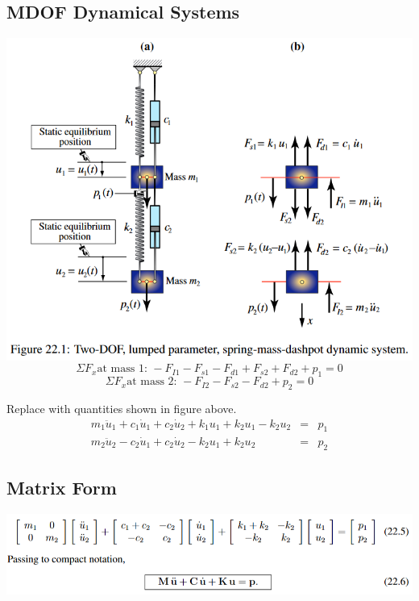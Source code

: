 \documentclass{article}
\begin{document}
\begin{multicols*}{2}
    \section*{MDOF Dynamical Systems}
    \includegraphics[width=\linewidth]{Figures/MDOF.png}
    $$\Sigma F_x \text{at mass 1: } -F_{I1}-F_{s1}-F_{d1}+F_{s2}+F_{d2}+p_1=0$$
    $$\Sigma F_x \text{at mass 2: } -F_{I2}-F_{s2}-F_{d2}+p_2=0$$

    Replace with quantities shown in figure above.
    $$\boxed{\begin{array}{rll}
        m_1\ddot{u}_1+c_1\dot{u}_1+c_2\dot{u}_2+k_1u_1+k_2u_1-k_2u_2 & = & p_1\\
        m_2\ddot{u}_2-c_2\dot{u}_1+c_2\dot{u}_2-k_2u_1+k_2u_2 & = & p_2
    \end{array}}$$

    \subsection*{Matrix Form}
    \includegraphics[width=\linewidth]{Figures/matrix_MDOF.png}
    \newpage

\end{multicols*}
\end{document}
